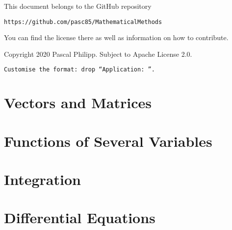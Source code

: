\documentclass[12pt,a4paper]{report}
\theoremstyle{definition}
\begin{document}
\bigskip
This document belongs to the GitHub repository
\begin{center}
\texttt{https://github.com/pasc85/MathematicalMethods}
\end{center}
You can find the license there as well as information on how to contribute.

\vfill
\noindent
Copyright 2020 Pascal Philipp. Subject to Apache License 2.0.

\thispagestyle{empty}
\newpage
\restoregeometry

\tableofcontents
\thispagestyle{empty}
\newpage
\listoftheorems[ignoreall,show={application}]

\bigskip
\noindent
\texttt{Customise the format: drop ``Application: ''.}
\thispagestyle{empty}
\restoregeometry


\chapter{Vectors and Matrices}
\label{ch:vm}


\chapter{Functions of Several Variables}
\label{ch:fsv}


\chapter{Integration}
\label{ch:i}


\chapter{Differential Equations}
\label{ch:de}


\printendnotes
\end{document}

